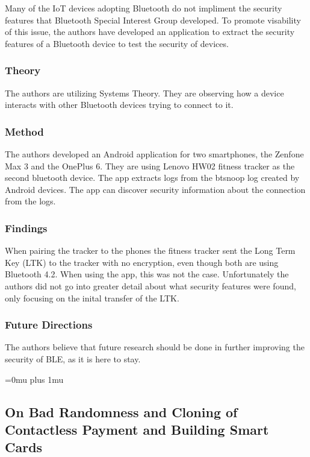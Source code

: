 \noindent
Many of the IoT devices adopting Bluetooth do not impliment the security features that Bluetooth Special Interest Group developed. To promote visability of this issue, the authors have developed an application to extract the security features of a Bluetooth device to test the security of devices. 

\subsubsection{Theory}

\noindent
The authors are utilizing Systems Theory. They are observing how a device interacts with other Bluetooth devices trying to connect to it.

\subsubsection{Method}

\noindent
The authors developed an Android application for two smartphones, the Zenfone Max 3 and the OnePlus 6. They are using  Lenovo HW02 fitness tracker as the second bluetooth device. The app extracts logs from the btsnoop log created by Android devices. The app can discover security information about the connection from the logs.

\subsubsection{Findings}

\noindent
When pairing the tracker to the phones the fitness tracker sent the Long Term Key (LTK) to the tracker with no encryption, even though both are using Bluetooth 4.2. When using the app, this was not the case. Unfortunately the authors did not go into greater detail about what security features were found, only focusing on the inital transfer of the LTK. 

\subsubsection{Future Directions}

\noindent
The authors believe that future research should be done in further improving the security of BLE, as it is here to stay. 

\Urlmuskip=0mu plus 1mu\relax

\noindent
\subsection{{O}n {B}ad {R}andomness and {C}loning of {C}ontactless {P}ayment and {B}uilding {S}mart {C}ards}

